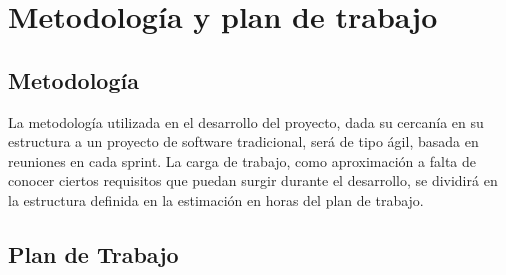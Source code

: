 \section{Metodología y plan de trabajo}
\subsection{Metodología}
La metodología utilizada en el desarrollo del proyecto, dada su cercanía en su estructura a un proyecto de software tradicional, será de tipo ágil, basada en reuniones en cada sprint.
La carga de trabajo, como aproximación a falta de conocer ciertos requisitos que puedan surgir durante el desarrollo, se dividirá en la estructura definida en la estimación en horas del plan de trabajo.

\subsection{Plan de Trabajo}


